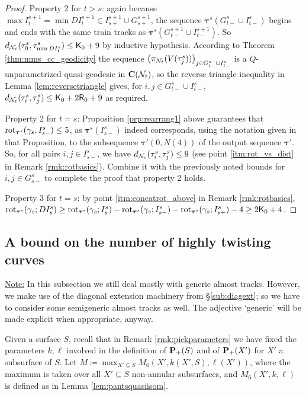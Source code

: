 \begin{proof}
Property 2 for $t>s$: again because $\max I^{s+1}_{t-}= \min DI^{s+1}_t \in I^{s+1}_{s+}\cup G^{s+1}_{s+}$, the sequence $\bm\tau^s(G^s_{t-}\cup I^s_{t-})$ begins and ends with the same train tracks as $\bm\tau^s(G^{s+1}_{t-}\cup I^{s+1}_{t-})$. So $d_{{\mathcal N}_t}(\tau^s_0,\tau^s_{\min DI^s_t})\leq \mathsf{K}_0+9$ by inductive hypothesis. According to Theorem \ref{thm:mms_cc_geodicity} the sequence $\left(\pi_{{\mathcal N}_t}(V(\tau^s_j))\right)_{j\in G^s_{t-}\cup I^s_{t-}}$ is a $Q$-unparametrized quasi-geodesic in $\mathbf C({\mathcal N}_t)$, so the reverse triangle inequality in Lemma \ref{lem:reversetriangle} gives, for $i,j\in G^s_{t-}\cup I^s_{t-}$, $d_{{\mathcal N}_t}(\tau^s_i,\tau^s_j)\leq \mathsf{K}_0+2\mathsf{R}_0+9$ as required.

Property 2 for $t=s$: Proposition \ref{prp:rearrang1} above guarantees that $\mathrm{rot}_{\bm\tau^s}(\gamma_s,I^s_{s-})\leq 5$, as $\bm\tau^s(I^s_{s-})$ indeed corresponds, using the notation given in that Proposition, to the subsequence $\bm\tau'\left(0,N(4)\right)$ of the output sequence $\bm\tau'$. So, for all pairs $i,j\in I^s_{s-}$, we have $d_{{\mathcal N}_s}(\tau^s_i,\tau^s_j)\leq 9$ (see point \ref{itm:rot_vs_dist} in Remark \ref{rmk:rotbasics}). Combine it with the previously noted bounds for $i,j\in G^s_{s-}$ to complete the proof that property 2 holds.

Property 3 for $t=s$: by point \ref{itm:concatrot_above} in Remark \ref{rmk:rotbasics}, $\mathrm{rot}_{\bm\tau^s}(\gamma_s;DI^s_s)\geq \mathrm{rot}_{\bm\tau^s}(\gamma_s;I^s_s) - \mathrm{rot}_{\bm\tau^s}(\gamma_s;I^s_{s-})- \mathrm{rot}_{\bm\tau^s}(\gamma_s;I^s_{s+})-4\geq 2\mathsf{K}_0+4$.
\end{proof}

\subsection{A bound on the number of highly twisting curves}
\label{sub:twistcurvebound}

\ul{Note:} In this subsection we still deal mostly with generic almost tracks. However, we make use of the diagonal extension machinery from \S \ref{sub:diagext}; so we have to consider some semigeneric almost tracks as well. The adjective `generic' will be made explicit when appropriate, anyway.

Given a surface $S$, recall that in Remark \ref{rmk:pickparameters} we have fixed the parameters $k,\ell$ involved in the definition of ${\mathbf{P}_+}(S)$ and of ${\mathbf{P}_+}(X')$ for $X'$ a subsurface of $S$. Let $M\coloneqq \max_{X'\subseteq S} M_6(X',k(X',S),\ell(X'))$, where the maximum is taken over all $X'\subseteq S$ non-annular subsurfaces, and $M_6(X',k,\ell)$ is defined as in Lemma \ref{lem:pantsquasiisom}.

